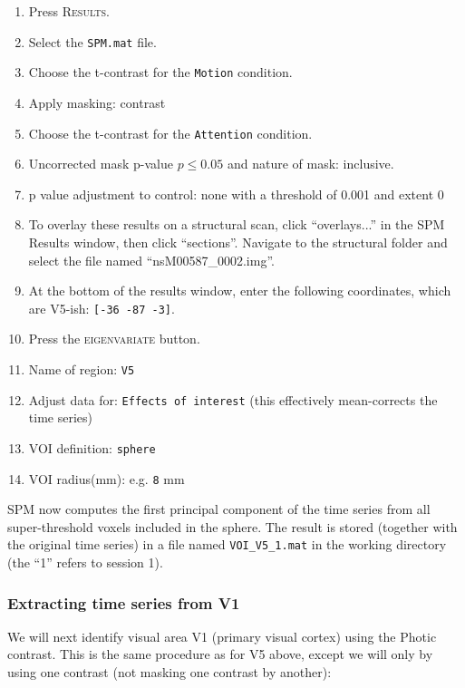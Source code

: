 \begin{enumerate}
 \item Press \textsc{Results}.
 \item Select the \texttt{SPM.mat} file.
 \item Choose the t-contrast for the \texttt{Motion} condition.
 \item Apply masking: contrast
 \item Choose the t-contrast for the \texttt{Attention} condition.
 \item Uncorrected mask p-value $p \leq 0.05$ and nature of mask: inclusive.
 \item p value adjustment to control: none with a threshold of 0.001 and extent 0
 \item To overlay these results on a structural scan, click ``overlays...'' in the SPM Results window, then click ``sections''. Navigate to the structural folder and select the file named ``nsM00587\_0002.img''.
 \item At the bottom of the results window, enter the following coordinates, which are V5-ish: \texttt{[-36 -87 -3]}.
 \item Press the \textsc{eigenvariate} button.
 \item Name of region: \texttt{V5}
 \item Adjust data for: \texttt{Effects of interest} (this effectively mean-corrects the time series)
 \item VOI definition: \texttt{sphere}
 \item VOI radius(mm): e.g. \texttt{8} mm
\end{enumerate}

SPM now computes the first principal component of the time series from all super-threshold voxels included in the sphere. The result is stored (together with the original time series) in a file named \texttt{VOI\_V5\_1.mat} in the working directory (the ``1'' refers to session 1).

\subsubsection{Extracting time series from V1}

We will next identify visual area V1 (primary visual cortex) using the Photic contrast. This is the same procedure as for V5 above, except we will only by using one contrast (not masking one contrast by another):

